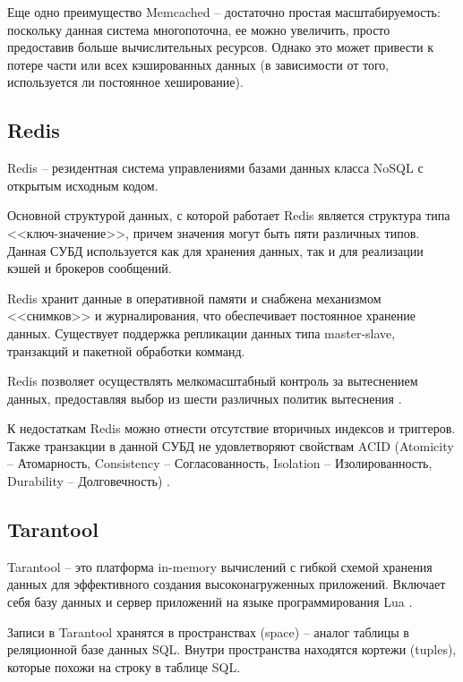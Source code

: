 Еще одно преимущество Memcached -- достаточно простая масштабируемость: поскольку данная система многопоточна, ее можно увеличить, просто предоставив больше вычислительных ресурсов. Однако это может привести к потере части или всех кэшированных данных (в зависимости от того, используется ли постоянное хеширование). 

\subsection{Redis}


Redis \cite{redis} -- резидентная система управлениями базами данных класса NoSQL с открытым исходным кодом. 

Основной структурой данных, с которой работает Redis является структура типа <<ключ-значение>>, причем значения могут быть пяти различных типов. Данная СУБД используется как для хранения данных, так и для реализации кэшей и брокеров сообщений.

Redis хранит данные в оперативной памяти и снабжена механизмом <<снимков>> и журналирования, что обеспечивает постоянное хранение данных. Существует поддержка репликации данных типа master-slave, транзакций и пакетной обработки комманд.

Redis позволяет осуществлять мелкомасштабный контроль за вытеснением данных, предоставляя выбор из шести различных политик вытеснения \cite{redis2}. 

К недостаткам Redis можно отнести отсутствие вторичных индексов и триггеров. Также транзакции в данной СУБД не удовлетворяют свойствам ACID (Atomicity -- Атомарность, Consistency -- Согласованность, Isolation -- Изолированность, Durability -- Долговечность) \cite{acid}.


\subsection{Tarantool}


Tarantool \cite{tarantool} -- это платформа in-memory вычислений с гибкой схемой хранения данных для эффективного создания высоконагруженных приложений. Включает себя базу данных и сервер приложений на языке программирования Lua \cite{lua}.

Записи в Tarantool хранятся в пространствах (space) -- аналог таблицы в реляционной базе данных SQL. Внутри пространства находятся кортежи (tuples), которые похожи на строку в таблице SQL. 


